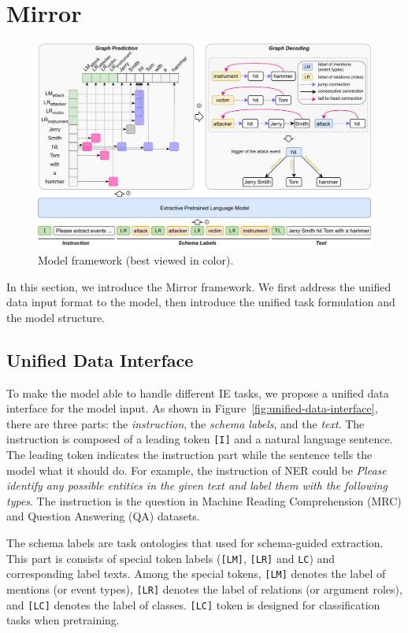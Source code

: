 \section{Mirror}


\begin{figure}[t]
    \centering
    \includegraphics[width=\textwidth]{figs/Model Framework.pdf}
    \caption{Model framework (best viewed in color).}
    \label{fig:model-framework}
\end{figure}

In this section, we introduce the Mirror framework.
We first address the unified data input format to the model, then introduce the unified task formulation and the model structure.

\subsection{Unified Data Interface}

To make the model able to handle different IE tasks, we propose a unified data interface for the model input.
As shown in Figure~\ref{fig:unified-data-interface}, there are three parts: the \textit{instruction}, the \textit{schema labels}, and the \textit{text}.
The instruction is composed of a leading token \verb|[I]| and a natural language sentence.
The leading token indicates the instruction part while the sentence tells the model what it should do.
For example, the instruction of NER could be \textit{Please identify any possible entities in the given text and label them with the following types}.
The instruction is the question in Machine Reading Comprehension (MRC) and Question Answering (QA) datasets.

The schema labels are task ontologies that used for schema-guided extraction.
This part is consists of special token labels (\verb|[LM]|, \verb|[LR]| and \verb|LC|) and corresponding label texts.
Among the special tokens, \verb|[LM]| denotes the label of mentions (or event types), \verb|[LR]| denotes the label of relations (or argument roles), and \verb|[LC]| denotes the label of classes.
\verb|[LC]| token is designed for classification tasks when pretraining.

